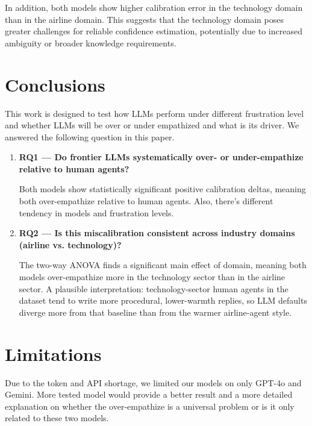 \documentclass[11pt]{article}
\begin{document}
In addition, both models show higher calibration error in the technology domain than in the airline domain. This suggests that the technology domain poses greater challenges for reliable confidence estimation, potentially due to increased ambiguity or broader knowledge requirements.




\section{Conclusions}

This work is designed to test how LLMs perform under different frustration level and whether LLMs will be over or under empathized and what is its driver. We answered the following question in this paper.

\begin{enumerate}
	\item \textbf{RQ1 — Do frontier LLMs systematically over- or under-empathize relative to human agents?}
	
	Both models show statistically significant positive calibration deltas, meaning both over-empathize relative to human agents. Also, there’s different tendency in models and frustration levels.
	
	
	\item \textbf{RQ2 — Is this miscalibration consistent across industry domains (airline vs. technology)?}
	
	The two-way ANOVA finds a significant main effect of domain, meaning both models over-empathize more in the technology sector than in the airline sector. A plausible interpretation: technology-sector human agents in the dataset tend to write more procedural, lower-warmth replies, so LLM defaults diverge more from that baseline than from the warmer airline-agent style.
	
\end{enumerate}


\section{Limitations}

Due to the token and API shortage, we limited our models on only GPT-4o and Gemini. More tested model would provide a better result and a more detailed explanation on whether the over-empathize is a universal problem or is it only related to these two models. 
\end{document}

